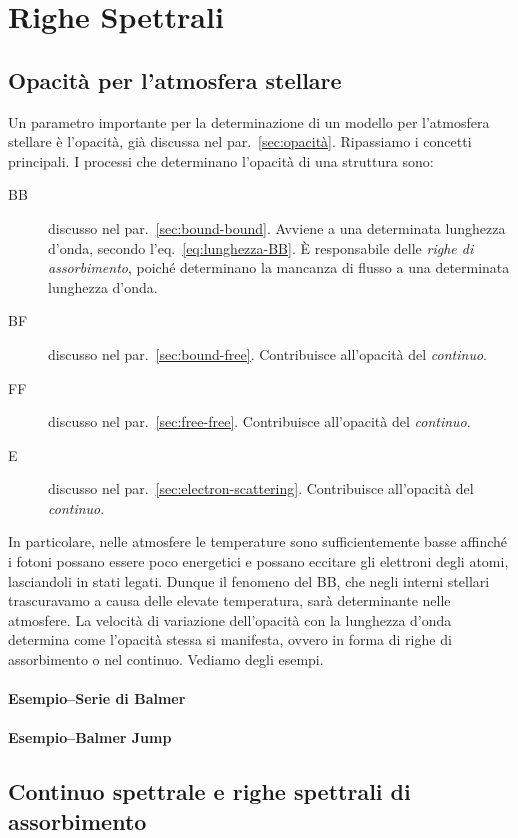 \section{Righe Spettrali}\label{sec:righe-spettrali}

\subsection{Opacità per l'atmosfera stellare}\label{sec:opacità-atmosfera}
Un parametro importante per la determinazione di un modello per l'atmosfera stellare è l'opacità, già discussa nel par.~\ref{sec:opacità}. Ripassiamo i concetti principali. I processi che determinano l'opacità di una struttura sono:
\begin{description}
    \item[BB] discusso nel par.~\ref{sec:bound-bound}. Avviene a una determinata lunghezza d'onda, secondo l'eq.~\eqref{eq:lunghezza-BB}. È responsabile delle \emph{righe di assorbimento}, poiché determinano la mancanza di flusso a una determinata lunghezza d'onda.
    \item[BF] discusso nel par.~\ref{sec:bound-free}. Contribuisce all'opacità del \emph{continuo}.
    \item[FF] discusso nel par.~\ref{sec:free-free}. Contribuisce all'opacità del \emph{continuo}.
    \item[E] discusso nel par.~\ref{sec:electron-scattering}. Contribuisce all'opacità del \emph{continuo}.
\end{description}
In particolare, nelle atmosfere le temperature sono sufficientemente basse affinché i fotoni possano essere poco energetici e possano eccitare gli elettroni degli atomi, lasciandoli in stati legati. Dunque il fenomeno del BB, che negli interni stellari trascuravamo a causa delle elevate temperatura, sarà determinante nelle atmosfere. La velocità di variazione dell'opacità con la lunghezza d'onda determina come l'opacità stessa si manifesta, ovvero in forma di righe di assorbimento o nel continuo. Vediamo degli esempi.

\paragraph{Esempio--Serie di Balmer}
\paragraph{Esempio--Balmer Jump}

\subsection{Continuo spettrale e righe spettrali di assorbimento}

